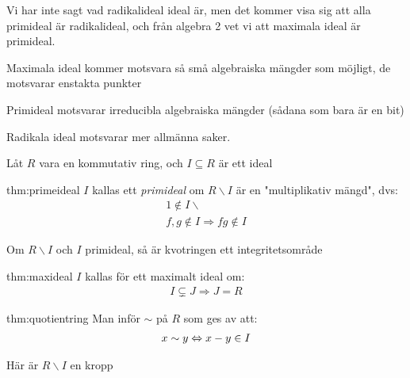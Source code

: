 \par\bigskip
\noindent Vi har inte sagt vad radikalideal ideal är, men det kommer visa sig att alla primideal är radikalideal, och från algebra 2 vet vi att maximala ideal är primideal.\par
\noindent Maximala ideal kommer motsvara så små algebraiska mängder som möjligt, de motsvarar enstakta punkter\par
\noindent Primideal motsvarar irreducibla algebraiska mängder (sådana som bara är en bit)\par
\noindent Radikala ideal motsvarar mer allmänna saker.
\par\bigskip
\noindent Låt $R$ vara en kommutativ ring, och $I\subseteq R$ är ett ideal
\par\bigskip
\begin{theo}[Primideal]{thm:primeideal}
  $I$ kallas ett \textit{primideal} om $R\backslash I$ är en "multiplikativ mängd", dvs:
  \begin{equation*}
    \begin{gathered}
      1\notin I\backslash\\
      f,g\notin I\Rightarrow fg\notin I
    \end{gathered}
  \end{equation*}\par
  \noindent Om $R\backslash I$ och $I$ primideal, så är kvotringen ett integritetsområde 
\end{theo}
\par\bigskip
\begin{theo}{thm:maxideal}
  $I$ kallas för ett maximalt ideal om:
  \begin{equation*}
    \begin{gathered}
      I\subsetneq J\Rightarrow J=R
    \end{gathered}
  \end{equation*}
\end{theo}
\par\bigskip
\begin{theo}[Kvotringen]{thm:quotientring}
  Man inför $\sim$ på $R$ som ges av att:
  \begin{equation*}
    \begin{gathered}
      x\sim y\Leftrightarrow x-y\in I
    \end{gathered}
  \end{equation*}\par
  \noindent Här är $R\backslash I$ en kropp
\end{theo}
\par\bigskip
